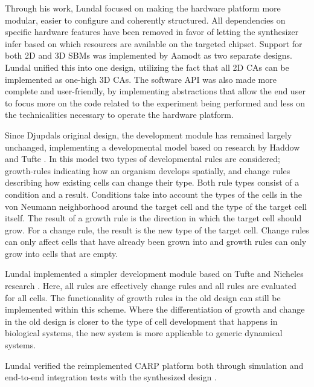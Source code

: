 Through his work, Lundal focused on making the hardware platform more modular,
easier to configure and coherently structured. All dependencies on specific
hardware features have been removed in favor of letting the synthesizer infer
based on which resources are available on the targeted chipset. Support for both
2D and 3D SBMs was implemented by Aamodt as two separate designs. Lundal unified
this into one design, utilizing the fact that all 2D CAs can be implemented as
one-high 3D CAs. The software API was also made more complete and user-friendly,
by implementing abstractions that allow the end user to focus more on the code
related to the experiment being performed and less on the technicalities
necessary to operate the hardware platform.

Since Djupdals original design, the development module has remained largely
unchanged, implementing a developmental model based on research by Haddow and
Tufte \cite{Tufte2005a}. In this model two types of developmental rules are
considered; growth-rules indicating how an organism develops spatially, and
change rules describing how existing cells can change their type. Both rule
types consist of a condition and a result. Conditions take into account the
types of the cells in the von Neumann neighborhood around the target cell and
the type of the target cell itself. The result of a growth rule is the direction
in which the target cell should grow. For a change rule, the result is the new
type of the target cell. Change rules can only affect cells that have already
been grown into and growth rules can only grow into cells that are empty.

Lundal implemented a simpler development module based on Tufte and Nicheles
research \cite{Nichele2013}. Here, all rules are effectively change rules and all
rules are evaluated for all cells. The functionality of growth rules in the old
design can still be implemented within this scheme. Where the differentiation of
growth and change in the old design is closer to the type of cell development
that happens in biological systems, the new system is more applicable to generic
dynamical systems.

Lundal verified the reimplemented CARP platform both through simulation and
end-to-end integration tests with the synthesized design . 

\cleardoublepage
